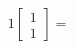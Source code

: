 \documentclass[preview]{standalone}
\begin{document}
\begin{align*}
1\begin{bmatrix} 1 \\ 1 \end{bmatrix} =
\end{align*}
\end{document}
